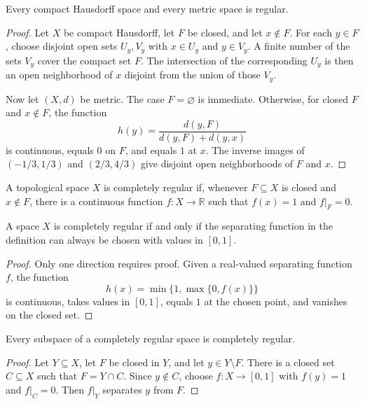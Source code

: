 \begin{thm}
Every compact Hausdorff space and every metric space is regular.
\end{thm}

\begin{proof}
Let $X$ be compact Hausdorff, let $F$ be closed, and let $x\notin F$. For each
$y\in F$, choose disjoint open sets $U_y,V_y$ with $x\in U_y$ and
$y\in V_y$. A finite number of the sets $V_y$ cover the compact set $F$.
The intersection of the corresponding $U_y$ is then an open neighborhood of
$x$ disjoint from the union of those $V_y$.

Now let $(X,d)$ be metric. The case $F=\varnothing$ is immediate. Otherwise,
for closed $F$ and $x\notin F$, the function
\[
h(y)=\frac{d(y,F)}{d(y,F)+d(y,x)}
\]
is continuous, equals $0$ on $F$, and equals $1$ at $x$. The inverse images of
$(-1/3,1/3)$ and $(2/3,4/3)$ give disjoint open neighborhoods of $F$ and
$x$.
\end{proof}

\begin{de}
A topological space $X$ is completely regular if, whenever $F\subseteq X$ is
closed and $x\notin F$, there is a continuous function
$f:X\to\mathbb{R}$ such that $f(x)=1$ and $f|_F=0$.
\end{de}

\begin{thm}
A space $X$ is completely regular if and only if the separating function in
the definition can always be chosen with values in $[0,1]$.
\end{thm}

\begin{proof}
Only one direction requires proof. Given a real-valued separating function
$f$, the function
\[
h(x)=\min\{1,\max\{0,f(x)\}\}
\]
is continuous, takes values in $[0,1]$, equals $1$ at the chosen point, and
vanishes on the closed set.
\end{proof}

\begin{thm}
Every subspace of a completely regular space is completely regular.
\end{thm}

\begin{proof}
Let $Y\subseteq X$, let $F$ be closed in $Y$, and let $y\in Y\setminus F$.
There is a closed set $C\subseteq X$ such that $F=Y\cap C$. Since $y\notin C$,
choose $f:X\to[0,1]$ with $f(y)=1$ and $f|_C=0$. Then $f|_Y$ separates $y$
from $F$.
\end{proof}

